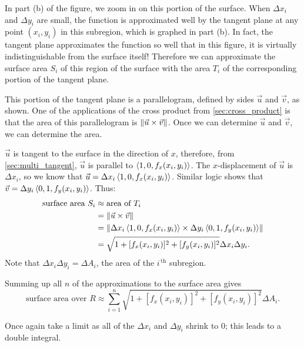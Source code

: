 In part (b) of the figure, we zoom in on this portion of the surface. When $\Delta x_i$ and $\Delta y_i$ are small, the function is approximated well by the tangent plane at any point $(x_i,y_i)$ in this subregion, which is graphed in part (b). In fact, the tangent plane approximates the function so well that in this figure, it is virtually indistinguishable from the surface itself! Therefore we can approximate the surface area $S_i$ of this region of the surface with the area $T_i$ of the corresponding portion of the tangent plane.

This portion of the tangent plane is a parallelogram, defined by sides $\vec u$ and $\vec v$, as shown. One of the applications of the cross product from \autoref{sec:cross_product} is that the area of this parallelogram is $\left\lVert \vec u\times \vec v \right\rVert$. Once we can determine $\vec u$ and $\vec v$, we can determine the area.

$\vec u$ is tangent to the surface in the direction of $x$, therefore, from \autoref{sec:multi_tangent}, $\vec u$ is parallel to $\left\langle 1,0,f_x(x_i,y_i)\right\rangle$. The $x$-displacement of $\vec u$ is $\Delta x_i$, so we know that $\vec u = \Delta x_i\left\langle 1,0,f_x(x_i,y_i)\right\rangle$. Similar logic shows that $\vec v = \Delta y_i\left\langle 0,1,f_y(x_i,y_i)\right\rangle$. Thus:
\begin{align*}
\text{surface area $S_i$}
	&\approx \text{area of  $T_i$}\\
	&= \left\lVert \vec u\times \vec v \right\rVert\\
	&= \left\lVert \Delta x_i\left\langle 1,0,f_x(x_i,y_i)\right\rangle\times\Delta y_i\left\langle 0,1,f_y(x_i,y_i)\right\rangle \right\rVert\\
	&=\sqrt{1+[f_x(x_i,y_i)]^2+[f_y(x_i,y_i)]^2}\Delta x_i\Delta y_i.
\end{align*}
Note that $\Delta x_i\Delta y_i = \Delta A_i$, the area of the $i^{\,\text{th}}$ subregion.

Summing up all $n$ of the approximations to the surface area gives
\[\text{surface area over $R$} \approx \sum_{i=1}^n \sqrt{1+[f_x(x_i,y_i)]^2+[f_y(x_i,y_i)]^2}\Delta A_i.\]

Once again take a limit as all of the $\Delta x_i$ and $\Delta y_i$ shrink to 0; this leads to a double integral.


